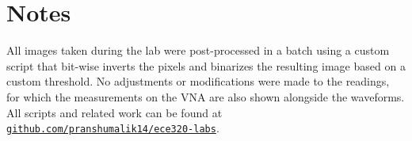 \documentclass[10pt]{article}
\begin{document}
\section{Notes}

All images taken during the lab were post-processed in a batch using a custom script
that bit-wise inverts the pixels and binarizes the resulting image based on a custom threshold.
No adjustments or modifications were made to the readings, for which the measurements on the VNA
are also shown alongside the waveforms. All scripts and related work can be found at 
\href{https://github.com/pranshumalik14/ece320-labs}{\texttt{github.com/pranshumalik14/ece320-labs}}.
\end{document}
